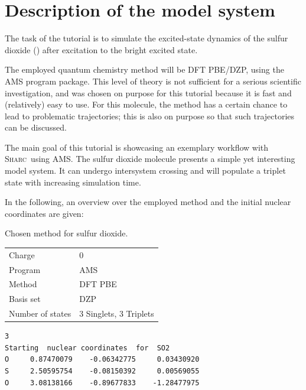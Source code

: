 \documentclass[a4paper,11pt,DIV=15,openany]{scrbook}
\newcommand{\sharc}{\textsc{Sharc}}
\newenvironment{example}{
  \vspace{0mm}
  \definecolor{shadecolor}{HTML}{E4F4FF}
  \begin{shaded}
}{
  \end{shaded}
}
\begin{document}



\section{Description of the model system}
\label{sec:model_system}

The task of the tutorial is to simulate the excited-state dynamics of the sulfur dioxide () after excitation to the bright excited state.

The employed quantum chemistry method will be DFT PBE/DZP, using the \textsc{AMS} program package. 
This level of theory is not sufficient for a serious scientific investigation, and was chosen on purpose for this tutorial because it is fast and (relatively) easy to use.
For this molecule, the method has a certain chance to lead to problematic trajectories; this is also on purpose so that such trajectories can be discussed.

The main goal of this tutorial is showcasing an exemplary workflow with \sharc\ using AMS. 
The sulfur dioxide molecule presents a simple yet interesting model system. It can undergo intersystem crossing and will populate a triplet state with increasing simulation time.

In the following, an overview over the employed method and the initial nuclear coordinates are given:

\begin{example}
\begin{minipage}{0.4\textwidth}
  \centering
  Chosen method for sulfur dioxide.
  \begin{tabular}{ll}
    \toprule
    Charge              &0\\
    Program             &\textsc{AMS}\\
    Method              &DFT PBE\\
    Basis set           &DZP\\
    Number of states    &3 Singlets, 3 Triplets\\
    \bottomrule
  \end{tabular}
\end{minipage}
\hfill
\begin{minipage}{0.55\textwidth}
  \begin{verbatim}
3
Starting  nuclear coordinates  for  SO2
O     0.87470079    -0.06342775     0.03430920 
S     2.50595754    -0.08150392     0.00569055 
O     3.08138166    -0.89677833    -1.28477975 
\end{verbatim}
\end{minipage}
\end{example}
\end{document}
